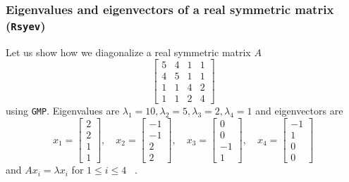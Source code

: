 \documentclass[12pt]{article}
\begin{document}
\subsubsection{Eigenvalues and eigenvectors of a real symmetric matrix ({\tt Rsyev})}
Let us show how we diagonalize a real symmetric matrix $A$
\[
\left[\begin{array}{llll}5 & 4 & 1 & 1 \\ 4 & 5 & 1 & 1 \\ 1 & 1 & 4 & 2 \\ 1 & 1 & 2 & 4\end{array}\right]
\]
using {\tt GMP}. Eigenvalues are $\lambda_1 = 10, \lambda_2 = 5, \lambda_3 = 2, \lambda_4 = 1$ and eigenvectors are
\[
x_{1}=\left[\begin{array}{l}2 \\ 2 \\ 1 \\ 1\end{array}\right], \quad x_{2}=\left[\begin{array}{c}-1 \\ -1 \\ 2 \\ 2\end{array}\right], \quad x_{3}=\left[\begin{array}{c}0 \\ 0 \\ -1 \\ 1\end{array}\right], \quad x_{4}=\left[\begin{array}{c}-1 \\ 1 \\ 0 \\ 0\end{array}\right]
\]
and $A x_{i} = \lambda x_{i}$ for $1\leq i \leq 4$ ~\cite{Gregory1969ACO}.
\end{document}
